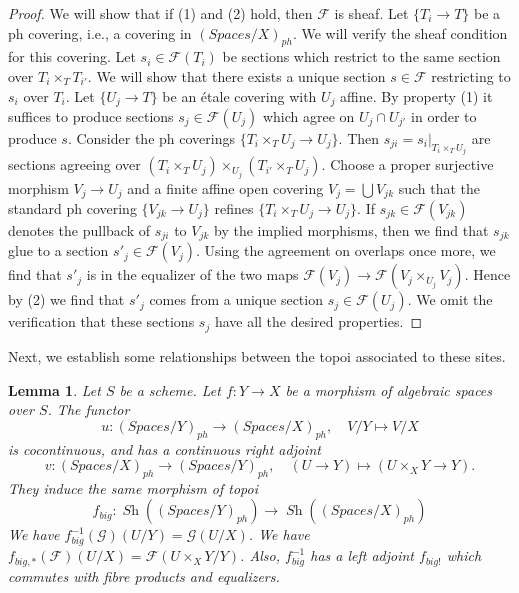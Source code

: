 \documentclass{stacks-project}
\theoremstyle{plain}
\newtheorem{lemma}[subsection]{Lemma}
\theoremstyle{definition}
\theoremstyle{remark}
\numberwithin{equation}{subsection}
\def\Sh{\mathop{\mathit{Sh}}\nolimits}
\begin{document}
\begin{proof}
We will show that if (1) and (2) hold, then $\mathcal{F}$ is sheaf.
Let $\{T_i \to T\}$ be a ph covering, i.e., a covering in
$(\textit{Spaces}/X)_{ph}$.
We will verify the sheaf condition for this covering.
Let $s_i \in \mathcal{F}(T_i)$ be sections which restrict to the same
section over $T_i \times_T T_{i'}$. We will show that there exists a
unique section $s \in \mathcal{F}$ restricting to $s_i$ over $T_i$.
Let $\{U_j \to T\}$ be an \'etale covering with $U_j$ affine.
By property (1) it suffices to produce sections $s_j \in \mathcal{F}(U_j)$
which agree on $U_j \cap U_{j'}$ in order to produce $s$.
Consider the ph coverings $\{T_i \times_T U_j \to U_j\}$.
Then $s_{ji} = s_i|_{T_i \times_T U_j}$ are sections agreeing
over $(T_i \times_T U_j) \times_{U_j} (T_{i'} \times_T U_j)$.
Choose a proper surjective morphism $V_j \to U_j$ and a finite affine
open covering $V_j = \bigcup V_{jk}$ such that the standard ph covering
$\{V_{jk} \to U_j\}$ refines $\{T_i \times_T U_j \to U_j\}$.
If $s_{jk} \in \mathcal{F}(V_{jk})$
denotes the pullback of $s_{ji}$ to $V_{jk}$ by the
implied morphisms, then we find that $s_{jk}$ glue to a section
$s'_j \in \mathcal{F}(V_j)$. Using the agreement on overlaps
once more, we find that $s'_j$ is in the equalizer of the two
maps $\mathcal{F}(V_j) \to \mathcal{F}(V_j \times_{U_j} V_j)$.
Hence by (2) we find that $s'_j$ comes from a unique section
$s_j \in \mathcal{F}(U_j)$. We omit the verification that these
sections $s_j$ have all the desired properties.
\end{proof}

\noindent
Next, we establish some relationships between the topoi
associated to these sites.

\begin{lemma}
\label{lemma-morphism-big-ph}
Let $S$ be a scheme.
Let $f : Y \to X$ be a morphism of algebraic spaces over $S$.
The functor
$$
u : (\textit{Spaces}/Y)_{ph} \longrightarrow (\textit{Spaces}/X)_{ph},
\quad
V/Y \longmapsto V/X
$$
is cocontinuous, and has a continuous right adjoint
$$
v : (\textit{Spaces}/X)_{ph} \longrightarrow (\textit{Spaces}/Y)_{ph},
\quad
(U \to Y) \longmapsto (U \times_X Y \to Y).
$$
They induce the same morphism of topoi
$$
f_{big} :
\Sh((\textit{Spaces}/Y)_{ph})
\longrightarrow
\Sh((\textit{Spaces}/X)_{ph})
$$
We have $f_{big}^{-1}(\mathcal{G})(U/Y) = \mathcal{G}(U/X)$.
We have $f_{big, *}(\mathcal{F})(U/X) = \mathcal{F}(U \times_X Y/Y)$.
Also, $f_{big}^{-1}$ has a left adjoint $f_{big!}$ which commutes with
fibre products and equalizers.
\end{lemma}
\end{document}
